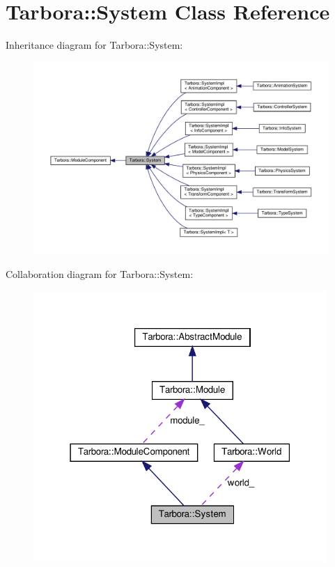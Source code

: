 \hypertarget{classTarbora_1_1System}{}\section{Tarbora\+:\+:System Class Reference}
\label{classTarbora_1_1System}


Inheritance diagram for Tarbora\+:\+:System\+:
\nopagebreak
\begin{figure}[H]
\begin{center}
\leavevmode
\includegraphics[width=350pt]{classTarbora_1_1System__inherit__graph}
\end{center}
\end{figure}


Collaboration diagram for Tarbora\+:\+:System\+:
\nopagebreak
\begin{figure}[H]
\begin{center}
\leavevmode
\includegraphics[width=316pt]{classTarbora_1_1System__coll__graph}
\end{center}
\end{figure}
